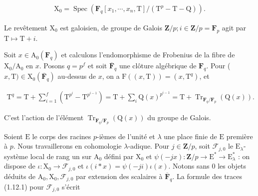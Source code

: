 \documentclass[10pt,leqno]{article}
\begin{document}
\begin{equation*}\begin{gathered}\mathrm{X}_{0} = \operatorname{Spec}(\mathbf{F}_{q}[x_{1},\cdots ,x_{n},\mathrm{T}]/(\mathrm{T}^{p}-\mathrm{T}-\mathrm{Q})).\end{gathered}\end{equation*}

\noindent Le revêtement \(\mathrm{X}_{0}\) est galoisien, de groupe de Galois \(\mathbf{Z}/p; i \in  \mathbf{Z}/p = \mathbf{F}_{p}\) agit par \(\mathrm{T} \longmapsto  \mathrm{T}+i\).\par

\noindent Soit \(x \in  \mathrm{A}_{0}(\mathbf{F}_{q})\) et calculons l'endomorphisme de Frobenius de la fibre de \(\mathrm{X}_{0}/\mathrm{A}_{0}\) en \(x\). Posons \(q = p^{f}\) et soit \(\overline{\mathbf{F}}_{q}\) une clôture algébrique de \(\mathbf{F}_{q}\). Pour (\(x,\mathrm{T}) \in  \mathrm{X}_{0}(\overline{\mathbf{F}}_{q})\) au-dessus de \(x\), on a \(\mathrm{F}((x,\mathrm{T})) = (x,\mathrm{T}^{q})\), et\par

\begin{equation*}\begin{gathered}\mathrm{T}^{q} = \mathrm{T} + \sum _{i=1}^{f} (\mathrm{T}^{p^{i}}-\mathrm{T}^{p^{i-1}}) = \mathrm{T} + \sum _{i} \mathrm{Q}(x)^{p^{i-1}} = \mathrm{T} + \operatorname{Tr}_{\mathbf{F}_{q}/\mathbf{F}_{p}}(\mathrm{Q}(x)).\end{gathered}\end{equation*}

\noindent C'est l'action de l'élément \(\operatorname{Tr}_{\mathbf{F}_{q}/\mathbf{F}_{p}}(\mathrm{Q}(x))\) du groupe de Galois.\par

\noindent Soient \(\mathrm{E}\) le corps des racines \(p\)-ièmes de l'unité et \(\lambda \) une place finie de \(\mathrm{E}\) première à \(p\). Nous travaillerons en cohomologie \(\lambda \)-adique. Pour \(j \in  \mathbf{Z}/p\), soit \(\mathcal{F} _{j,0}\) le \(\mathrm{E}_{\lambda }\)-système local de rang un sur \(\mathrm{A}_{0}\) défini par \(\mathrm{X}_{0}\) et \(\psi (-jx) : \mathbf{Z}/p \longrightarrow  \mathrm{E}^{*} \longrightarrow  \mathrm{E}_{\lambda }^{*}\) : on dispose de \(\iota  : \mathrm{X}_{0} \longrightarrow  \mathcal{F} _{j,0}\) et \(\iota (i*x) = \psi (-ji)\iota (x)\). Notons sans 0 les objets déduits de \(\mathrm{A}_{0}, \mathrm{X}_{0}, \mathcal{F} _{j,0}\) par extension des scalaires à \(\overline{\mathbf{F}}_{q}\). La formule des traces (1.12.1) pour \(\mathcal{F} _{j,0}\) s'écrit\par
\end{document}
